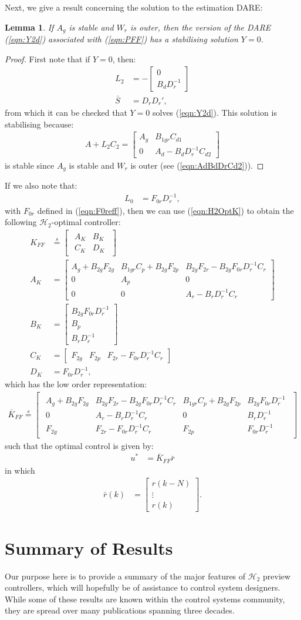 \documentclass[a4paper,12pt]{article}
\newtheorem{lem}[thm]{Lemma}
\theoremstyle{remark}
\newcommand{\arr}[2]{
        \begin{array}{#1}
        #2
        \end{array}}
\newcommand{\shorteq}{\stackrel{s}{=}}
\newcommand{\ma}[1]{\begin{bmatrix} #1 \end{bmatrix}}
\newcommand{\als}[1]{\begin{align*} #1 \end{align*}}
\newcommand{\htwo}{\mathcal H_2}
\newcommand{\rf}[1]{{\mathbf{#1}}}
\newcommand{\B}{{\rf{ B}} }
\begin{document}
Next, we give a result concerning the solution to the estimation DARE:
\begin{lem}
If $A_g$ is stable and $W_r$ is outer, then the version of the DARE (\ref{eqn:Y2d}) associated with (\ref{eqn:PFF}) has a stabilising solution $Y=0$.
\end{lem}
\begin{proof}
First note that if $Y=0$, then:
\als{
L_2&= -\ma{0\\B_dD_r^{-1}}\\
\bar S&= D_rD_r'
,}
from which it can be checked that $Y=0$ solves (\ref{eqn:Y2d}). This solution is stabilising because:
\als{
A+L_2C_2=\ma{A_g &B_{1gr}C_{d1}\\0&A_d-B_dD_r^{-1}C_{d2}  }
}
is stable since $A_g$ is stable and $W_r$ is outer (see (\ref{eqn:AdBdDrCd2})).
\end{proof}
If we also note that:
\als{L_0&= F_{0r}D_r^{-1},}
with $F_{0r}$ defined in (\ref{eqn:F0reff}),
then we can use (\ref{eqn:H2OptK}) to obtain the following $\htwo$-optimal controller:
\als{
K_{FF}& \shorteq \ma{\arr{c|c}{A_K&B_K\\\hline C_K&D_K}}\\
A_K&=\ma{A_g+B_{2g}F_{2g}&B_{1gr}C_p+B_{2g}F_{2p}&B_{2g}F_{2r}-B_{2g}F_{0r}D_r^{-1}C_r\\
0&A_p&0\\
0&0&A_r-B_rD_r^{-1}C_r}\\
B_K&=\ma{B_{2g}F_{0r}D_r^{-1}\\
	B_p\\
	B_rD_r^{-1}}\\
C_K&=\ma{F_{2g}&F_{2p}&F_{2r}-F_{0r}D_r^{-1}C_r}\\
D_K&=F_{0r}D_r^{-1}
,}
%
which has the low order representation:
\als{
\bar K_{FF} \shorteq \ma{\arr{cc|cc}{
A_g+B_{2g}F_{2g}&B_{2g}F_{2r}-B_{2g}F_{0r}D_r^{-1}C_r  & B_{1gr}C_p+B_{2g}F_{2p} & B_{2g}F_{0r}D_r^{-1}\\
0 & A_r-B_rD_r^{-1}C_r & 0 & B_rD_r^{-1}\\\hline
F_{2g} & F_{2r}-F_{0r}D_r^{-1}C_r & F_{2p} & F_{0r}D_r^{-1}
}}}
%
such that the optimal control is given by:
\als{
u^*&=\bar K_{FF} \bar r
}
in which
\als{
\bar r(k)&=\ma{r(k-N)\\\vdots\\r(k)}.
}


\section{Summary of Results} 
\label{sec:H2PrevSum}
Our purpose here is to provide a summary of the major features of $\htwo$ preview controllers, which will hopefully be of assistance to control system designers. While some of these results are known within the control systems community, they are spread over many publications spanning three decades. 
\end{document}
